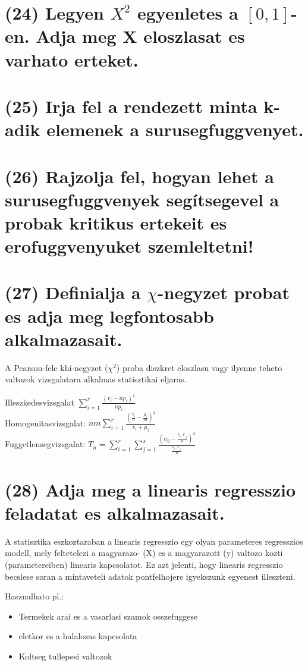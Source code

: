 \documentclass[12p]{article}
\begin{document}
\section{(24) Legyen $X^2$ egyenletes a $[0, 1]$-en. Adja meg X eloszlasat es varhato erteket.}

\section{(25) Irja fel a rendezett minta k-adik elemenek a surusegfuggvenyet.}

\section{(26) Rajzolja fel, hogyan lehet a surusegfuggvenyek segítsegevel a probak kritikus ertekeit es erofuggvenyuket szemleltetni!}

\section{(27) Definialja a $\chi$-negyzet probat es adja meg legfontosabb alkalmazasait.}

A Pearson-fele khí-negyzet ($\chi^2$) proba diszkret eloszlasu vagy ilyenne teheto valtozok vizsgalatara alkalmas statisztikai eljaras.

Illeszkedesvizsgalat $\displaystyle{\sum_{i=1}^r \frac{(v_i - np_i)^2}{np_i}}$\\
Homogenitasvizsgalat: $\displaystyle{nm \sum_{i=1}^r \frac{(\frac{v_i}{n}-\frac{\mu_i}{m})^2}{v_i + \mu_i}}$\\
Fuggetlensegvizsgalat: $\displaystyle{T_n = \sum_{i=1}^r \sum_{j=1}^s 
\frac{(v_{ij} - \frac{v_{i\cdot}v_{\cdot j}}{n})^2
}{\frac{v_{i\cdot}v_{\cdot j}}{n}}}$

\section{(28) Adja meg a linearis regresszio feladatat es alkalmazasait.}

A statisztika eszkoztaraban a linearis regresszio egy olyan parameteres regresszios modell, mely feltetelezi a magyarazo- (X) es a magyarazott (y) valtozo kozti (parametereiben) linearis kapcsolatot. Ez azt jelenti, hogy linearis regresszio becslese soran a mintaveteli adatok pontfelhojere igyekszunk egyenest illeszteni.

Hasznalhato pl.:

\begin{itemize}
	\item Termekek arai es a vasarlasi szamok osszefuggese
	\item eletkor es a halalozas kapcsolata
	\item Koltseg tullepesi valtozok
\end{itemize}
\end{document}
